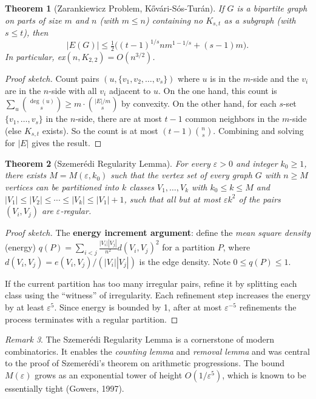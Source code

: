 \documentclass[12pt,a4paper]{amsart}
\newtheorem{theorem}{Theorem}[section]
\theoremstyle{definition}
\theoremstyle{remark}
\newtheorem{remark}[theorem]{Remark}
\begin{document}
\begin{theorem}[Zarankiewicz Problem, K\H{o}v\'{a}ri-S\'{o}s-Tur\'{a}n]
\label{thm:zarankiewicz}
If $G$ is a bipartite graph on parts of size $m$ and $n$ (with $m \le n$)
containing no $K_{s,t}$ as a subgraph (with $s \le t$), then
\[
  |E(G)| \le \tfrac{1}{2}\bigl((t-1)^{1/s} n m^{1-1/s} + (s-1)m\bigr).
\]
In particular, ex$(n, K_{2,2}) = O(n^{3/2})$.
\end{theorem}

\begin{proof}[Proof sketch]
Count pairs $(u, \{v_1, v_2, \ldots, v_s\})$ where $u$ is in the $m$-side
and the $v_i$ are in the $n$-side with all $v_i$ adjacent to $u$. On the
one hand, this count is $\sum_{u} \binom{\deg(u)}{s} \ge m \cdot \binom{|E|/m}{s}$
by convexity. On the other hand, for each $s$-set $\{v_1, \ldots, v_s\}$ in
the $n$-side, there are at most $t-1$ common neighbors in the $m$-side
(else $K_{s,t}$ exists). So the count is at most $(t-1)\binom{n}{s}$.
Combining and solving for $|E|$ gives the result.
\end{proof}

\begin{theorem}[Szemer\'{e}di Regularity Lemma]
\label{thm:szemeredi}
For every $\varepsilon > 0$ and integer $k_0 \ge 1$, there exists $M = M(\varepsilon, k_0)$
such that the vertex set of every graph $G$ with $n \ge M$ vertices can be
partitioned into $k$ classes $V_1, \ldots, V_k$ with $k_0 \le k \le M$ and
$|V_1| \le |V_2| \le \cdots \le |V_k| \le |V_1| + 1$, such that all but at
most $\varepsilon k^2$ of the pairs $(V_i, V_j)$ are $\varepsilon$-regular.
\end{theorem}

\begin{proof}[Proof sketch]
The \textbf{energy increment argument}: define the \emph{mean square density}
(energy) $q(P) = \sum_{i<j} \frac{|V_i||V_j|}{n^2} d(V_i, V_j)^2$ for a
partition $P$, where $d(V_i, V_j) = e(V_i, V_j)/(|V_i||V_j|)$ is the edge
density. Note $0 \le q(P) \le 1$.

If the current partition has too many irregular pairs, refine it by splitting
each class using the ``witness'' of irregularity. Each refinement step
increases the energy by at least $\varepsilon^5$. Since energy is bounded by
1, after at most $\varepsilon^{-5}$ refinements the process terminates with
a regular partition.
\end{proof}

\begin{remark}
The Szemer\'{e}di Regularity Lemma is a cornerstone of modern combinatorics.
It enables the \emph{counting lemma} and \emph{removal lemma} and was
central to the proof of Szemer\'{e}di's theorem on arithmetic progressions.
The bound $M(\varepsilon)$ grows as an exponential tower of height $O(1/\varepsilon^5)$,
which is known to be essentially tight (Gowers, 1997).
\end{remark}
\end{document}
